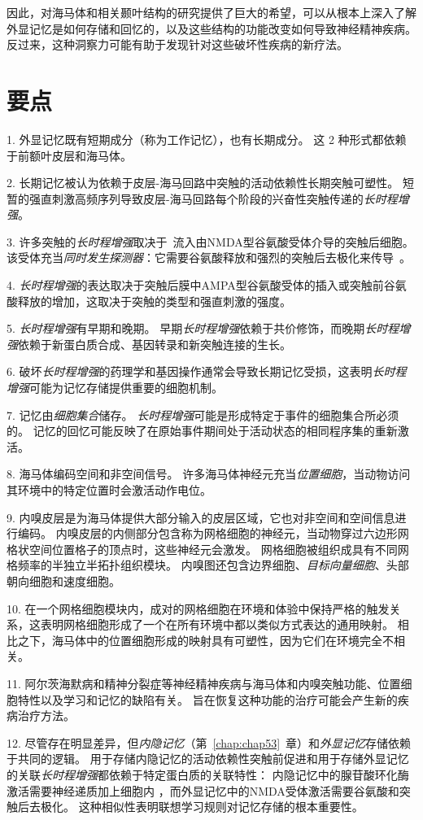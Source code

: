 因此，对海马体和相关颞叶结构的研究提供了巨大的希望，可以从根本上深入了解外显记忆是如何存储和回忆的，以及这些结构的功能改变如何导致神经精神疾病。
反过来，这种洞察力可能有助于发现针对这些破坏性疾病的新疗法。



\section{要点}

1. 外显记忆既有短期成分（称为工作记忆），也有长期成分。
这 2 种形式都依赖于前额叶皮层和海马体。


2. 长期记忆被认为依赖于皮层-海马回路中突触的活动依赖性长期突触可塑性。
短暂的强直刺激高频序列导致皮层-海马回路每个阶段的兴奋性突触传递的\textit{长时程增强}。


3. 许多突触的\textit{长时程增强}取决于~流入由NMDA型谷氨酸受体介导的突触后细胞。
该受体充当\textit{同时发生探测器}：它需要谷氨酸释放和强烈的突触后去极化来传导~。


4. \textit{长时程增强}的表达取决于突触后膜中AMPA型谷氨酸受体的插入或突触前谷氨酸释放的增加，这取决于突触的类型和强直刺激的强度。


5. \textit{长时程增强}有早期和晚期。
早期\textit{长时程增强}依赖于共价修饰，而晚期\textit{长时程增强}依赖于新蛋白质合成、基因转录和新突触连接的生长。


6. 破坏\textit{长时程增强}的药理学和基因操作通常会导致长期记忆受损，这表明\textit{长时程增强}可能为记忆存储提供重要的细胞机制。


7. 记忆由\textit{细胞集合}储存。
\textit{长时程增强}可能是形成特定于事件的细胞集合所必须的。
记忆的回忆可能反映了在原始事件期间处于活动状态的相同程序集的重新激活。


8. 海马体编码空间和非空间信号。
许多海马体神经元充当\textit{位置细胞}，当动物访问其环境中的特定位置时会激活动作电位。


9. 内嗅皮层是为海马体提供大部分输入的皮层区域，它也对非空间和空间信息进行编码。
内嗅皮层的内侧部分包含称为网格细胞的神经元，当动物穿过六边形网格状空间位置格子的顶点时，这些神经元会激发。
网格细胞被组织成具有不同网格频率的半独立半拓扑组织模块。
内嗅图还包含边界细胞、\textit{目标向量细胞}、头部朝向细胞和速度细胞。


10. 在一个网格细胞模块内，成对的网格细胞在环境和体验中保持严格的触发关系，这表明网格细胞形成了一个在所有环境中都以类似方式表达的通用映射。
相比之下，海马体中的位置细胞形成的映射具有可塑性，因为它们在环境完全不相关。


11. 阿尔茨海默病和精神分裂症等神经精神疾病与海马体和内嗅突触功能、位置细胞特性以及学习和记忆的缺陷有关。
旨在恢复这种功能的治疗可能会产生新的疾病治疗方法。 


12. 尽管存在明显差异，但\textit{内隐记忆}（第~\ref{chap:chap53}~章）和\textit{外显记忆}存储依赖于共同的逻辑。
用于存储内隐记忆的活动依赖性突触前促进和用于存储外显记忆的关联\textit{长时程增强}都依赖于特定蛋白质的关联特性：
内隐记忆中的腺苷酸环化酶激活需要神经递质加上细胞内 ，而外显记忆中的NMDA受体激活需要谷氨酸和突触后去极化。
这种相似性表明联想学习规则对记忆存储的根本重要性。






